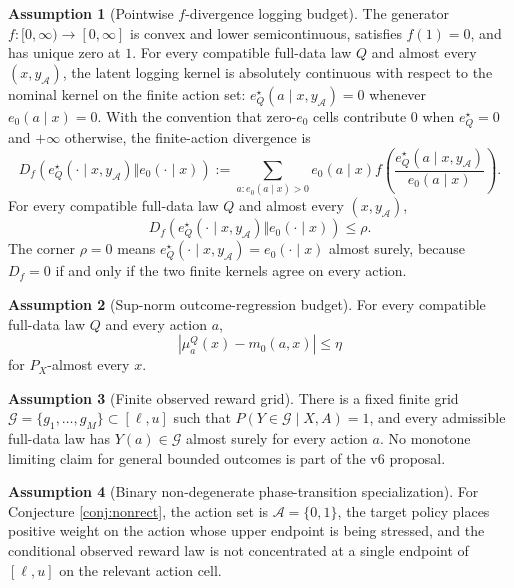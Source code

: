 \documentclass[11pt]{article}
\theoremstyle{definition}
\newtheorem{assumption}{Assumption}
\theoremstyle{plain}
\theoremstyle{remark}
\begin{document}
\begin{assumption}[Pointwise $f$-divergence logging budget]\label{ass:f-budget}
The generator $f:[0,\infty)\to[0,\infty]$ is convex and lower semicontinuous, satisfies $f(1)=0$, and has unique zero at $1$. For every compatible full-data law $Q$ and almost every $(x,y_{\mathcal A})$, the latent logging kernel is absolutely continuous with respect to the nominal kernel on the finite action set:
$e_Q^\star(a\mid x,y_{\mathcal A})=0$ whenever $e_0(a\mid x)=0$. With the convention that zero-$e_0$ cells contribute $0$ when $e_Q^\star=0$ and $+\infty$ otherwise,
the finite-action divergence is
\[
  D_f(e_Q^\star(\cdot\mid x,y_{\mathcal A})\Vert e_0(\cdot\mid x))
  :=\sum_{a:e_0(a\mid x)>0}e_0(a\mid x)
      f\!\left(\frac{e_Q^\star(a\mid x,y_{\mathcal A})}{e_0(a\mid x)}\right).
\]
For every compatible full-data law $Q$ and almost every $(x,y_{\mathcal A})$,
\[
  D_f(e_Q^\star(\cdot\mid x,y_{\mathcal A})\Vert e_0(\cdot\mid x))\le \rho .
\]
The corner $\rho=0$ means $e_Q^\star(\cdot\mid x,y_{\mathcal A})=e_0(\cdot\mid x)$ almost surely, because $D_f=0$ if and only if the two finite kernels agree on every action.
\end{assumption}

\begin{assumption}[Sup-norm outcome-regression budget]\label{ass:outcome-gap}
For every compatible full-data law $Q$ and every action $a$,
\[
  |\mu_a^Q(x)-m_0(a,x)|\le \eta
\]
for $P_X$-almost every $x$.
\end{assumption}

\begin{assumption}[Finite observed reward grid]\label{ass:finite-support}
There is a fixed finite grid $\mathcal G=\{g_1,\ldots,g_M\}\subset[\ell,u]$ such that $P(Y\in\mathcal G\mid X,A)=1$, and every admissible full-data law has $Y(a)\in\mathcal G$ almost surely for every action $a$. No monotone limiting claim for general bounded outcomes is part of the v6 proposal.
\end{assumption}

\begin{assumption}[Binary non-degenerate phase-transition specialization]\label{ass:binary-nondegenerate}
For Conjecture \ref{conj:nonrect}, the action set is $\mathcal A=\{0,1\}$, the target policy places positive weight on the action whose upper endpoint is being stressed, and the conditional observed reward law is not concentrated at a single endpoint of $[\ell,u]$ on the relevant action cell.
\end{assumption}
\end{document}
